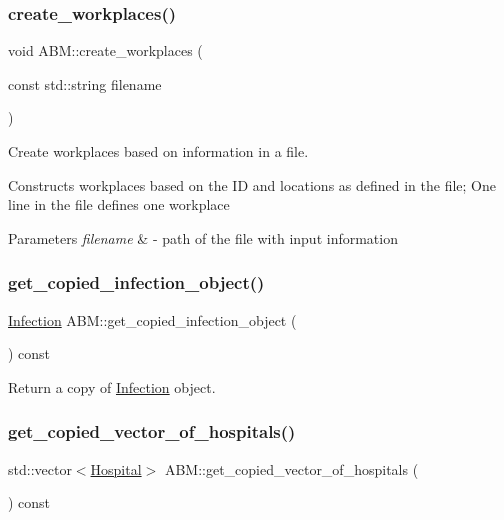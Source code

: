 \subsubsection{\texorpdfstring{create\+\_\+workplaces()}{create\_workplaces()}}
{\footnotesize\ttfamily void A\+B\+M\+::create\+\_\+workplaces (\begin{DoxyParamCaption}\item[{const std\+::string}]{filename }\end{DoxyParamCaption})}



Create workplaces based on information in a file. 

Constructs workplaces based on the ID and locations as defined in the file; One line in the file defines one workplace


\begin{DoxyParams}{Parameters}
{\em filename} & -\/ path of the file with input information \\
\hline
\end{DoxyParams}
\mbox{\label{classABM_af1ae91cc0294e370e6a686e80e6594f8}} 
\subsubsection{\texorpdfstring{get\+\_\+copied\+\_\+infection\+\_\+object()}{get\_copied\_infection\_object()}}
{\footnotesize\ttfamily \hyperlink{classInfection}{Infection} A\+B\+M\+::get\+\_\+copied\+\_\+infection\+\_\+object (\begin{DoxyParamCaption}{ }\end{DoxyParamCaption}) const\hspace{0.3cm}{\ttfamily [inline]}}



Return a copy of \hyperlink{classInfection}{Infection} object. 

\mbox{\label{classABM_ab07282ad3610001a8e7e3b1cd5929748}} 
\subsubsection{\texorpdfstring{get\+\_\+copied\+\_\+vector\+\_\+of\+\_\+hospitals()}{get\_copied\_vector\_of\_hospitals()}}
{\footnotesize\ttfamily std\+::vector$<$\hyperlink{classHospital}{Hospital}$>$ A\+B\+M\+::get\+\_\+copied\+\_\+vector\+\_\+of\+\_\+hospitals (\begin{DoxyParamCaption}{ }\end{DoxyParamCaption}) const\hspace{0.3cm}{\ttfamily [inline]}}



